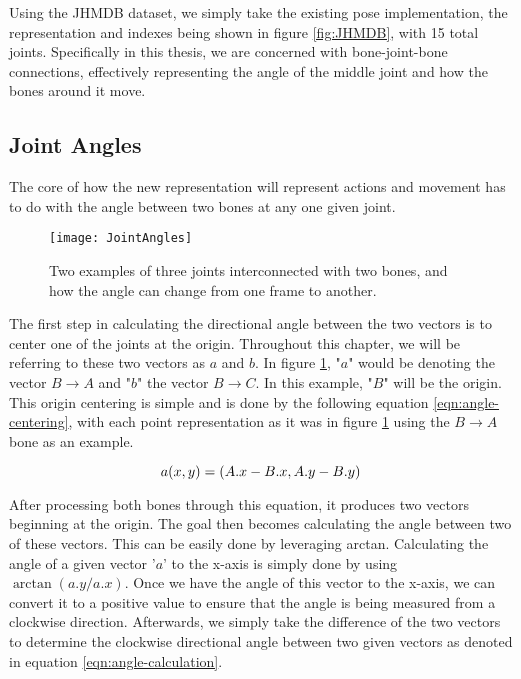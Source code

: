 Using the JHMDB dataset, we simply take the existing pose implementation, the representation and indexes being shown in figure \ref{fig:JHMDB}, with 15 total joints. Specifically in this thesis, we are concerned with bone-joint-bone connections, effectively representing the angle of the middle joint and how the bones around it move.

\subsection{Joint Angles}

The core of how the new representation will represent actions and movement has to do with the angle between two bones at any one given joint.

\begin{figure}[ht]
	\texttt{[image: JointAngles]}
	\centering
	\caption{Two examples of three joints interconnected with two bones, and how the angle can change from one frame to another.}
	\label{fig:joint-angles}
\end{figure}

The first step in calculating the directional angle between the two vectors is to center one of the joints at the origin. Throughout this chapter, we will be referring to these two vectors as $a$ and $b$. In figure \ref{fig:joint-angles}, "$a$" would be denoting the vector $B \rightarrow A$ and "$b$" the vector $B \rightarrow C$. In this example, "$B$" will be the origin. This origin centering is simple and is done by the following equation \ref{eqn:angle-centering}, with each point representation as it was in figure \ref{fig:joint-angles} using the $B \rightarrow A$ bone as an example.

\begin{equation}
	\label{eqn:angle-centering}
	\centering
	a(x,y) = (A.x - B.x, A.y - B.y)
\end{equation}

After processing both bones through this equation, it produces two vectors beginning at the origin. The goal then becomes calculating the angle between two of these vectors. This can be easily done by leveraging arctan. Calculating the angle of a given vector '$a$' to the x-axis is simply done by using $\arctan(a.y/a.x)$. Once we have the angle of this vector to the x-axis, we can convert it to a positive value to ensure that the angle is being measured from a clockwise direction. Afterwards, we simply take the difference of the two vectors to determine the clockwise directional angle between two given vectors as denoted in equation \ref{eqn:angle-calculation}.


